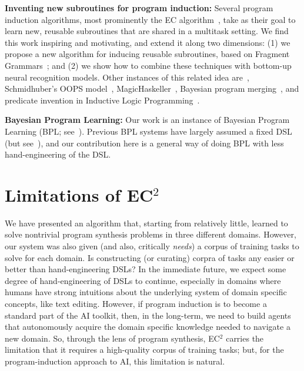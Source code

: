 \documentclass{article}
\begin{document}
 \noindent \textbf{Inventing new subroutines for program induction:}
 Several program induction algorithms, most prominently the EC algorithm~\cite{Dechter:2013:BLV:2540128.2540316}, take as their goal to learn new, reusable subroutines that are shared in a multitask setting. We find this work inspiring and motivating,
 and extend it along two dimensions: (1) we propose a new algorithm for
 inducing reusable subroutines, based on Fragment Grammars~\cite{tim};
 and (2) we show how to combine these techniques with bottom-up neural recognition models.
 Other instances of this related idea are~\cite{DBLP:conf/icml/LiangJK10}, Schmidhuber's OOPS model~\cite{schmidhuber2004optimal}, MagicHaskeller~\cite{katayama2015towards}, Bayesian program merging~\cite{hwang2011inducing}, and predicate invention in Inductive Logic Programming~\cite{DBLP:conf/ecai/LinDETM14}.
 
\noindent\textbf{Bayesian Program
 Learning:} Our work is an instance of
 Bayesian Program
 Learning (BPL; see~\citep{lake2015human,Dechter:2013:BLV:2540128.2540316,ellis2016sampling,DBLP:conf/icml/LiangJK10,ellis2015unsupervised}). Previous BPL systems have largely assumed a fixed DSL (but see~\cite{DBLP:conf/icml/LiangJK10}),
 and our contribution here is a general way of doing BPL with less hand-engineering of the DSL.
 
 \section{Limitations of EC$^2$}

 We have presented an algorithm that, starting from relatively little,
 learned to solve nontrivial program synthesis problems in three
 different domains.  However, our system was also given (and also,
 critically \emph{needs}) a corpus of training tasks to solve for each
 domain.  Is constructing (or curating) corpra of tasks any easier or
 better than hand-engineering DSLs?  In the immediate future, we
 expect some degree of hand-engineering of DSLs to continue, especially
 in domains where humans have strong intuitions about the underlying
 system of domain specific concepts, like text editing. However, if
 program induction is to become a standard part of the AI toolkit,
 then, in the long-term, we need to build agents that autonomously
 acquire the domain specific knowledge needed to navigate a new
 domain.  So, through the lens of program synthesis, EC$^2$ carries
 the limitation that it requires a high-quality corpus of training
 tasks; but, for the program-induction approach to AI, this limitation
 is natural.
\end{document}
